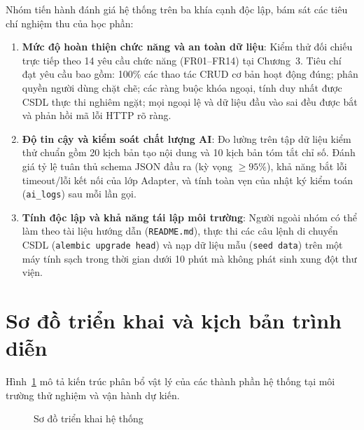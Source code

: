 Nhóm tiến hành đánh giá hệ thống trên ba khía cạnh độc lập, bám sát các tiêu chí nghiệm thu của học phần:
\begin{enumerate}
\item \textbf{Mức độ hoàn thiện chức năng và an toàn dữ liệu}: Kiểm thử đối chiếu trực tiếp theo 14 yêu cầu chức năng (FR01--FR14) tại Chương~3. Tiêu chí đạt yêu cầu bao gồm: 100\% các thao tác CRUD cơ bản hoạt động đúng; phân quyền người dùng chặt chẽ; các ràng buộc khóa ngoại, tính duy nhất được CSDL thực thi nghiêm ngặt; mọi ngoại lệ và dữ liệu đầu vào sai đều được bắt và phản hồi mã lỗi HTTP rõ ràng.
\item \textbf{Độ tin cậy và kiểm soát chất lượng AI}: Đo lường trên tập dữ liệu kiểm thử chuẩn gồm 20 kịch bản tạo nội dung và 10 kịch bản tóm tắt chỉ số. Đánh giá tỷ lệ tuân thủ schema JSON đầu ra (kỳ vọng $\ge 95\%$), khả năng bắt lỗi timeout/lỗi kết nối của lớp Adapter, và tính toàn vẹn của nhật ký kiểm toán (\texttt{ai\_logs}) sau mỗi lần gọi.
\item \textbf{Tính độc lập và khả năng tái lập môi trường}: Người ngoài nhóm có thể làm theo tài liệu hướng dẫn (\texttt{README.md}), thực thi các câu lệnh di chuyển CSDL (\texttt{alembic upgrade head}) và nạp dữ liệu mẫu (\texttt{seed data}) trên một máy tính sạch trong thời gian dưới 10 phút mà không phát sinh xung đột thư viện.
\end{enumerate}

\section{Sơ đồ triển khai và kịch bản trình diễn}\label{sec:v8-deployment}

Hình~\ref{fig:v8-deployment} mô tả kiến trúc phân bổ vật lý của các thành phần hệ thống tại môi trường thử nghiệm và vận hành dự kiến.

\begin{figure}[H]
\centering

\caption{Sơ đồ triển khai hệ thống}
\label{fig:v8-deployment}
\end{figure}

